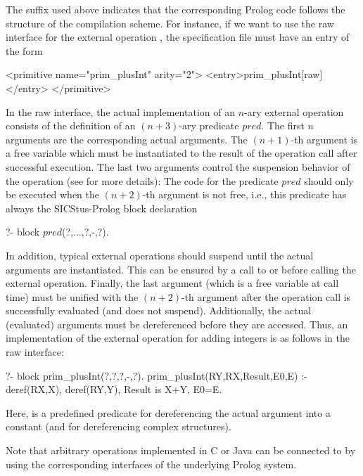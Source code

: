 \begin{enumerate}
The suffix \ccode{[raw]} used above indicates that the corresponding Prolog
code follows the structure of the \CYS compilation scheme.
For instance, if we want to use the raw interface for the external operation
,
the specification file  must have an entry of the form
\begin{curry}
<primitive name="prim_plusInt" arity="2">
  <entry>prim_plusInt[raw]</entry>
</primitive>
\end{curry}
In the raw interface, the actual implementation of
an $n$-ary external operation consists
of the definition of an $(n+3)$-ary predicate $pred$.
The first $n$ arguments are the corresponding actual arguments.
The $(n+1)$-th argument is a free variable which must be
instantiated to the result of the operation call after
successful execution. The last two arguments
control the suspension behavior of the operation
(see \cite{AntoyHanus00FROCOS} for more details):
The code for the predicate $pred$
should only be executed when the $(n+2)$-th argument
is not free, i.e., this predicate has always the
SICStus-Prolog block declaration
\begin{curry}
?- block $pred$(?,$\ldots$,?,-,?).
\end{curry}
In addition, typical external operations should suspend
until the actual arguments are instantiated. This can be ensured
by a call to  or \code{(\$\#)}
before calling the external operation. Finally, the
last argument (which is a free variable at call time)
must be unified with the $(n+2)$-th argument
after the operation call is successfully evaluated
(and does not suspend). Additionally, the actual (evaluated) arguments
must be dereferenced before they are accessed.
Thus, an implementation
of the external operation for adding integers is as follows in the raw interface:
\begin{curry}
?- block prim_plusInt(?,?,?,-,?).
prim_plusInt(RY,RX,Result,E0,E) :-
     deref(RX,X), deref(RY,Y), Result is X+Y, E0=E.
\end{curry}
Here,  is a predefined predicate for dereferencing the
actual argument into a constant (and  for dereferencing
complex structures).
\end{enumerate}
%
Note that arbitrary operations implemented in C or Java can be connected to
\CYS by using the corresponding interfaces of the underlying Prolog system.


